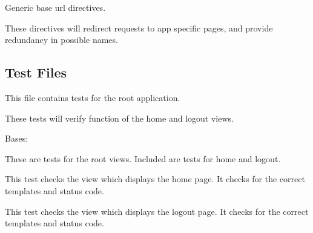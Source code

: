 \documentclass[letterpaper,10pt,english]{sphinxmanual}
\begin{document}
\label{api:module-mousedb.urls}
Generic base url directives.

These directives will redirect requests to app specific pages, and provide redundancy in possible names.


\subsection{Test Files}
\label{api:test-files}\label{api:module-mousedb.tests}
This file contains tests for the root application.

These tests will verify function of the home and logout views.


\begin{fulllineitems}
\label{api:mousedb.tests.RootViewTests}
Bases: 

These are tests for the root views.  Included are tests for home and logout.


\begin{fulllineitems}
\label{api:mousedb.tests.RootViewTests.setUp}
\end{fulllineitems}



\begin{fulllineitems}
\label{api:mousedb.tests.RootViewTests.tearDown}
\end{fulllineitems}



\begin{fulllineitems}
\label{api:mousedb.tests.RootViewTests.test_home}
This test checks the view which displays the home page.  It checks for the correct templates and status code.

\end{fulllineitems}



\begin{fulllineitems}
\label{api:mousedb.tests.RootViewTests.test_logout}
This test checks the view which displays the logout page.  It checks for the correct templates and status code.

\end{fulllineitems}


\end{fulllineitems}
\end{document}
